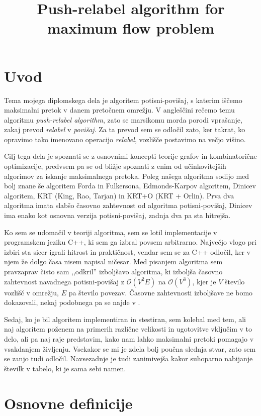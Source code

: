 \documentclass[mat1]{fmfdelo}
\title{Push-relabel algorithm for maximum flow problem}
\begin{document}
\section{Uvod}

Tema mojega diplomskega dela je algoritem potisni-povišaj, s katerim iščemo maksimalni pretok v danem pretočnem omrežju. V angleščini rečemo temu algoritmu \textit{push-relabel algorithm}, zato se marsikomu morda porodi vprašanje,
zakaj prevod \textit{relabel} v \textit{povišaj}. Za ta prevod sem se odločil zato, ker takrat, ko opravimo tako imenovano operacijo \textit{relabel}, vozlišče postavimo na večjo višino.

Cilj tega dela je spoznati se z osnovnimi koncepti teorije grafov in kombinatorične optimizacije, predvsem pa se od bližje spoznati z enim od učinkovitejših algorimov za iskanje maksimalnega pretoka. Poleg našega algoritma
sodijo med bolj znane še algoritem Forda in Fulkersona, Edmonds-Karpov algoritem, Dinicev algoritem, KRT (King, Rao, Tarjan) in KRT+O (KRT + Orlin). Prva dva algoritma imata slabšo časovno zahtevnost od algoritma potisni-povišaj,
Dinicev ima enako kot osnovna verzija potisni-povišaj, zadnja dva pa sta hitrejša.

Ko sem se udomačil v teoriji algoritma, sem se lotil implementacije v programskem jeziku C++, ki sem ga izbral povsem arbitrarno. Največjo vlogo pri izbiri sta sicer igrali hitrost in praktičnost, vendar sem se za C++ odločil, ker v njem
že dolgo časa nisem napisal ničesar. Med pisanjem algoritma sem pravzaprav čisto sam ,,odkril'' izboljšavo algoritma, ki izboljša časovno zahtevnost navadnega potisni-povišaj z $\mathcal{O}(V^2E)$ na $\mathcal{O}(V^3)$, kjer je $V$ število vozlišč
v omrežju, $E$ pa število povezav. Časovne zahtevnosti izboljšave ne bomo dokazovali, nekaj podobnega pa se najde v \cite{clrs}.

Sedaj, ko je bil algoritem implementiran in stestiran, sem kolebal med tem, ali naj algoritem poženem na primerih različne velikosti in ugotovitve vključim v to delo, ali pa naj raje predstavim, kako nam lahko maksimalni pretoki pomagajo
v vsakdanjem življenju. Vsekakor se mi je zdela bolj poučna slednja stvar, zato sem se zanjo tudi odločil. Navsezadnje je tudi zanimivejša kakor suhoparno nabijanje številk v tabelo, ki je sama sebi namen.

\section{Osnovne definicije}
\end{document}
